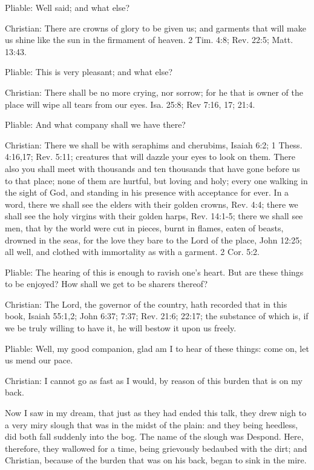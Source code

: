 Pliable: Well said; and what else? 

Christian: There are crowns of glory to be given us; and garments that will make us shine like the sun in the firmament of heaven. 2 Tim. 4:8; Rev. 22:5; Matt. 13:43. 

Pliable: This is very pleasant; and what else? 

Christian: There shall be no more crying, nor sorrow; for he that is owner of the place will wipe all tears from our eyes. Isa. 25:8; Rev 7:16, 17; 21:4. 

Pliable: And what company shall we have there? 

Christian: There we shall be with seraphims and cherubims, Isaiah 6:2; 1 Thess. 4:16,17; Rev. 5:11; creatures that will dazzle your eyes to look on them. There also you shall meet with thousands and ten thousands that have gone before us to that place; none of them are hurtful, but loving and holy; every one walking in the sight of God, and standing in his presence with acceptance for ever. In a word, there we shall see the elders with their golden crowns, Rev. 4:4; there we shall see the holy virgins with their golden harps, Rev. 14:1-5; there we shall see men, that by the world were cut in pieces, burnt in flames, eaten of beasts, drowned in the seas, for the love they bare to the Lord of the place, John 12:25; all well, and clothed with immortality as with a garment. 2 Cor. 5:2. 

Pliable: The hearing of this is enough to ravish one's heart. But are these things to be enjoyed? How shall we get to be sharers thereof? 

Christian: The Lord, the governor of the country, hath recorded that in this book, Isaiah 55:1,2; John 6:37; 7:37; Rev. 21:6; 22:17; the substance of which is, if we be truly willing to have it, he will bestow it upon us freely. 

Pliable: Well, my good companion, glad am I to hear of these things: come on, let us mend our pace. 

Christian: I cannot go as fast as I would, by reason of this burden that is on my back. 

Now I saw in my dream, that just as they had ended this talk, they drew nigh to a very miry slough that was in the midst of the plain: and they being heedless, did both fall suddenly into the bog. The name of the slough was Despond. Here, therefore, they wallowed for a time, being grievously bedaubed with the dirt; and Christian, because of the burden that was on his back, began to sink in the mire. 

